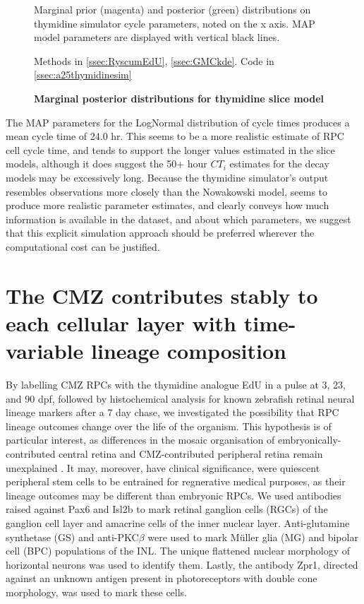 \begin{figure}[!h]
    \caption{{\bf Marginal posterior distributions for thymidine slice model}}
    Marginal prior (magenta) and posterior (green) distributions on thymidine simulator cycle parameters, noted on the x axis. MAP model parameters are displayed with vertical black lines.

    Methods in \autoref{ssec:RyscumEdU}, \autoref{ssec:GMCkde}. Code in \autoref{ssec:a25thymidinesim}
    \label{a25marg}
\end{figure}

The MAP parameters for the LogNormal distribution of cycle times produces a mean cycle time of 24.0 hr. This seems to be a more realistic estimate of RPC cell cycle time, and tends to support the longer values estimated in the slice models, although it does suggest the 50+ hour $CT_{i}$ estimates for the decay models may be excessively long. Because the thymidine simulator's output resembles observations more closely than the Nowakowski model, seems to produce more realistic parameter estimates, and clearly conveys how much information is available in the dataset, and about which parameters, we suggest that this explicit simulation approach should be preferred wherever the computational cost can be justified.

\section{The CMZ contributes stably to each cellular layer with time-variable lineage composition}

By labelling CMZ RPCs with the thymidine analogue EdU in a pulse at 3, 23, and 90 dpf, followed by histochemical analysis for known zebrafish retinal neural lineage markers after a 7 day chase, we investigated the possibility that RPC lineage outcomes change over the life of the organism. This hypothesis is of particular interest, as differences in the mosaic organisation of embryonically-contributed central retina and CMZ-contributed peripheral retina remain unexplained \cite{Allison2010}. It may, moreover, have clinical significance, were quiescent peripheral stem cells to be entrained for regnerative medical purposes, as their lineage outcomes may be different than embryonic RPCs.  We used antibodies raised against Pax6 and Isl2b to mark retinal ganglion cells (RGCs) of the ganglion cell layer and amacrine cells of the inner nuclear layer. Anti-glutamine synthetase (GS) and anti-PKC$\beta$ were used to mark M\"{u}ller glia (MG) and bipolar cell (BPC) populations of the INL. The unique flattened nuclear morphology of horizontal neurons was used to identify them. Lastly, the antibody Zpr1, directed against an unknown antigen present in photoreceptors with double cone morphology, was used to mark these cells.


